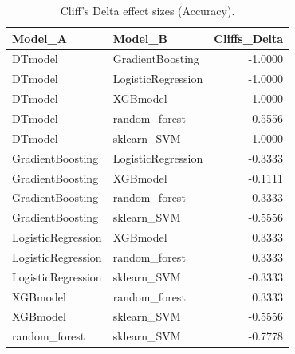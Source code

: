 \begin{table}[t]
\centering
\begin{tabular}{llr}
\toprule
Model_A & Model_B & Cliffs_Delta \\
\midrule
DTmodel & GradientBoosting & -1.0000 \\
DTmodel & LogisticRegression & -1.0000 \\
DTmodel & XGBmodel & -1.0000 \\
DTmodel & random_forest & -0.5556 \\
DTmodel & sklearn_SVM & -1.0000 \\
GradientBoosting & LogisticRegression & -0.3333 \\
GradientBoosting & XGBmodel & -0.1111 \\
GradientBoosting & random_forest & 0.3333 \\
GradientBoosting & sklearn_SVM & -0.5556 \\
LogisticRegression & XGBmodel & 0.3333 \\
LogisticRegression & random_forest & 0.3333 \\
LogisticRegression & sklearn_SVM & -0.3333 \\
XGBmodel & random_forest & 0.3333 \\
XGBmodel & sklearn_SVM & -0.5556 \\
random_forest & sklearn_SVM & -0.7778 \\
\bottomrule
\end{tabular}
\caption{Cliff's Delta effect sizes (Accuracy).}
\label{tab:cliffs_Accuracy}
\end{table}